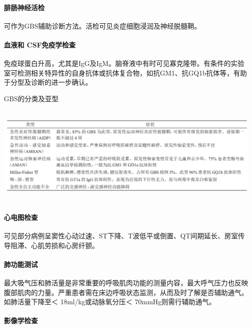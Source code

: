 \paragraph{腓肠神经活检}

可作为GBS辅助诊断方法。活检可见炎症细胞浸润及神经脱髓鞘。

\paragraph{血液和 CSF免疫学检查}

免疫球蛋白升高，尤其是IgG及IgM。脑脊液中有时可见寡克隆带。有条件的实验室可检测相关特异性的自身抗体或抗体复合物，如抗GM1、抗GQ1b抗体等，有助于分型及诊断的进一步确认。

\begin{table}[htbp]
\centering
\caption{GBS的分类及亚型}
\label{tab91-1}
\includegraphics[width=6.57292in,height=1.94792in]{./images/Image00392.jpg}
\end{table}

\paragraph{心电图检查}

可见部分病例呈窦性心动过速、ST下降、T波低平或倒置、QT间期延长、房室传导阻滞、心肌劳损和心房纤颤。

\paragraph{肺功能测试}

最大吸气压和肺活量是非常重要的呼吸肌肉功能的测量内容，最大呼气压力也反映腹部肌肉的力量。严重患者需在床边呼吸状态监测，从而及时了解是否辅助通气。如肺活量下降至＜
18ml/kg或动脉氧分压＜ 70mmHg则需行辅助通气。

\paragraph{影像学检查}


